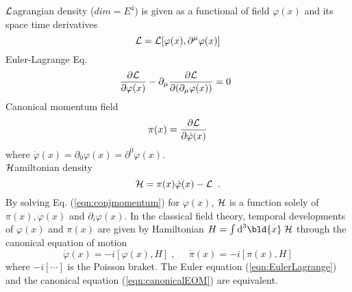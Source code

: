 ${\cal L}$agrangian density ($dim = E^4$) is given as a functional of field $\varphi(x)$
and its space time derivatives
\begin{equation}
	{\cal L} = {\cal L}[\varphi(x), \partial^\mu\varphi(x)]
\end{equation}
Euler-Lagrange Eq.
\begin{equation}
 \frac{ \partial {\cal L}}{ \partial {\varphi}(x) } - 
\partial_\mu \frac{ \partial {\cal L}}{ \partial (\partial_\mu {\varphi}(x) )} = 0
 \;\;
 \label{eqn:EulerLagrange}
\end{equation}
Canonical momentum field
\begin{equation}
\pi(x) = \frac{ \partial {\cal L}}{ \partial \dot{\varphi}(x) }
\label{eqn:conjmomentum}
\end{equation}
where $\dot{\varphi}(x) = \partial_0 \varphi(x) = \partial^0 \varphi(x)$.\\
${\cal H}$amiltonian density
\begin{equation}
{\cal H} = \pi(x) \dot{\varphi}(x) -  {\cal L}\;\;.
\label{eqn:Hamiltoniandensity}
\end{equation}
By solving Eq. (\ref{eqn:conjmomentum}) for $\dot\varphi(x)$,
${\cal H}$ is a function solely of $\pi(x), \varphi(x)$ and $ \partial_i \varphi(x)$.
In the classical field theory, temporal developments of $\varphi(x)$ and $\pi(x)$
are given by Hamiltonian $H = \int \mbox{d}^3\bld{x} \; {\cal H}$
through the canonical equation of motion
\begin{equation}
\dot{\varphi}(x) = -i [\varphi(x), H ]\;, \; \; \; \; \; \dot{\pi}(x) = -i [\pi(x), H ]
\label{eqn:canonicalEOM}
\end{equation}
where $-i[\cdots]$ is the Poisson braket.
The Euler equation (\ref{eqn:EulerLagrange}) and 
the canonical equation (\ref{eqn:canonicalEOM})
are equivalent.

\bigskip


